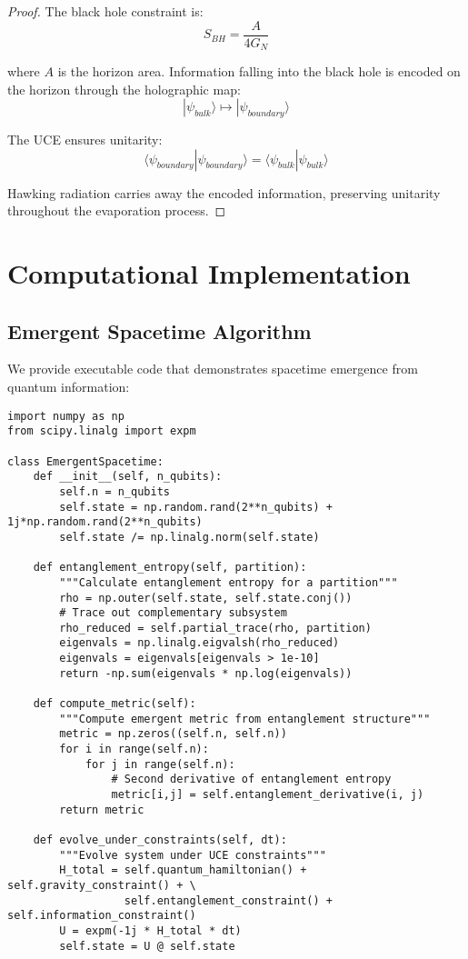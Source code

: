 \documentclass[12pt,a4paper]{article}
\begin{document}
\begin{proof}
The black hole constraint is:
\begin{equation}
S_{BH} = \frac{A}{4G_N}
\end{equation}

where $A$ is the horizon area. Information falling into the black hole is encoded on the horizon through the holographic map:
\begin{equation}
|\psi_{bulk}\rangle \mapsto |\psi_{boundary}\rangle
\end{equation}

The UCE ensures unitarity:
\begin{equation}
\langle \psi_{boundary}|\psi_{boundary} \rangle = \langle \psi_{bulk}|\psi_{bulk} \rangle
\end{equation}

Hawking radiation carries away the encoded information, preserving unitarity throughout the evaporation process.
\end{proof}

\section{Computational Implementation}

\subsection{Emergent Spacetime Algorithm}

We provide executable code that demonstrates spacetime emergence from quantum information:

\begin{lstlisting}
import numpy as np
from scipy.linalg import expm

class EmergentSpacetime:
    def __init__(self, n_qubits):
        self.n = n_qubits
        self.state = np.random.rand(2**n_qubits) + 1j*np.random.rand(2**n_qubits)
        self.state /= np.linalg.norm(self.state)
        
    def entanglement_entropy(self, partition):
        """Calculate entanglement entropy for a partition"""
        rho = np.outer(self.state, self.state.conj())
        # Trace out complementary subsystem
        rho_reduced = self.partial_trace(rho, partition)
        eigenvals = np.linalg.eigvalsh(rho_reduced)
        eigenvals = eigenvals[eigenvals > 1e-10]
        return -np.sum(eigenvals * np.log(eigenvals))
    
    def compute_metric(self):
        """Compute emergent metric from entanglement structure"""
        metric = np.zeros((self.n, self.n))
        for i in range(self.n):
            for j in range(self.n):
                # Second derivative of entanglement entropy
                metric[i,j] = self.entanglement_derivative(i, j)
        return metric
    
    def evolve_under_constraints(self, dt):
        """Evolve system under UCE constraints"""
        H_total = self.quantum_hamiltonian() + self.gravity_constraint() + \
                  self.entanglement_constraint() + self.information_constraint()
        U = expm(-1j * H_total * dt)
        self.state = U @ self.state
\end{lstlisting}
\end{document}
